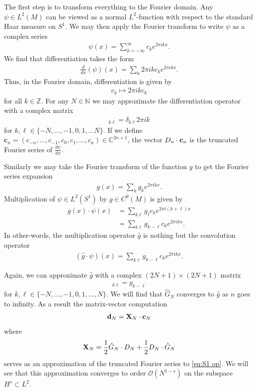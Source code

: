 \documentclass[12pt]{amsart}
\begin{document}
The first step is to transform everything to the Fourier domain.  Any $\psi \in L^2(M)$ can be viewed as a normal $L^2$-function with respect to the standard Haar measure on $S^1$.  We may then apply the Fourier transform to write $\psi$ as a complex series
\begin{align}
	\psi(x) = \sum_{k=-\infty}^\infty c_k e^{2\pi i k x}.
\end{align}
We find that differentiation takes the form
\begin{align}
	\frac{d}{dx} (\psi)(x) = \sum_{k} 2\pi i k c_k e^{2\pi i kx}.
\end{align}
Thus, in the Fourier domain, differentiation is given by
\begin{align}
 	c_k \mapsto 2 \pi ik c_k
\end{align}
for all $k \in \mathbb{Z}$.
For any $N \in \mathbb{N}$ we may approximate the differentiation operator with a complex matrix
\begin{align*}
	[D_N]_{k \ell } = \delta_{k \ell } 2\pi i k
\end{align*}
for $k,\ell \in \{ -N , \dots,-1,0,1,\dots N \}$.
If we define $\mathbf{c}_n = ( c_{-n}, \dots , c_{-1} , c_0 , c_{1},\dots,c_n ) \in \mathbb{C}^{2n+1}$, the vector $D_n \cdot {\bf c}_n$ is the truncated Fourier series of $\frac{d\psi}{dx}$.

Similarly we may take the Fourier transform of the function $g$ to get the Fourier series expansion
\begin{align}
	g(x) = \sum_k g_k e^{2\pi i kx}.
\end{align}
Multiplication of $\psi \in L^2(S^1)$ by $g \in C^0(M)$ is given by
\begin{align}
	g(x) \cdot \psi(x) &= \sum_{k \ell} g_\ell c_k e^{2\pi i (k+\ell)x} \\
		&= \sum_{k \ell} g_{k-\ell} c_k e^{2\pi i kx}.
\end{align}
In other-words, the multiplication operator $\hat{g}$ is nothing but the convolution operator
\begin{align}
	( \hat{g} \cdot \psi )(x) = \sum_{k \ell} g_{k-\ell} c_k e^{2\pi i kx}.
\end{align}

Again, we can approximate $\hat{g}$ with a complex $(2N+1) \times (2N+1)$ matrix
\begin{align}
	[\hat{G}_N]_{k\ell} = g_{k - \ell}
\end{align}
for $k,\ell \in \{ -N , \dots,-1,0,1,\dots,N\}$.
We will find that $\hat{G}_N$ converges to $\hat{g}$ as $n$ goes to infinity.
As a result the matrix-vector computation
\begin{align}
	 {\bf d}_N = {\bf X}_N \cdot {\bf c}_N
\end{align}
where
\begin{align}
	{\bf X}_N = \frac{1}{2} \hat{G}_N \cdot D_N + \frac{1}{2} D_N \cdot \hat{G}_N
\end{align}
serves as an approximation of the truncated Fourier series to \eqref{eq:S1 op}.
We will see that this approximation converges to order $\mathcal{O}( N^{1-s} )$ on the subspace $H^{s} \subset L^{2}$.
\end{document}
